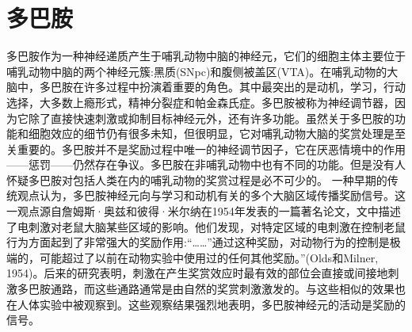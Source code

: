 \section{多巴胺}

多巴胺作为一种神经递质产生于哺乳动物中脑的神经元，它们的细胞主体主要位于哺乳动物中脑的两个神经元簇:黑质(SNpc)和腹侧被盖区(VTA)。在哺乳动物的大脑中，多巴胺在许多过程中扮演着重要的角色。其中最突出的是动机，学习，行动选择，大多数上瘾形式，精神分裂症和帕金森氏症。多巴胺被称为神经调节器，因为它除了直接快速刺激或抑制目标神经元外，还有许多功能。虽然关于多巴胺的功能和细胞效应的细节仍有很多未知，但很明显，它对哺乳动物大脑的奖赏处理是至关重要的。多巴胺并不是奖励过程中唯一的神经调节因子，它在厌恶情境中的作用——惩罚——仍然存在争议。多巴胺在非哺乳动物中也有不同的功能。但是没有人怀疑多巴胺对包括人类在内的哺乳动物的奖赏过程是必不可少的。
一种早期的传统观点认为，多巴胺神经元向与学习和动机有关的多个大脑区域传播奖励信号。这一观点源自詹姆斯·奥兹和彼得·米尔纳在1954年发表的一篇著名论文，文中描述了电刺激对老鼠大脑某些区域的影响。他们发现，对特定区域的电刺激在控制老鼠行为方面起到了非常强大的奖励作用:“……”通过这种奖励，对动物行为的控制是极端的，可能超过了以前在动物实验中使用过的任何其他奖励。”(Olds和Milner, 1954)。后来的研究表明，刺激在产生奖赏效应时最有效的部位会直接或间接地刺激多巴胺通路，而这些通路通常是由自然的奖赏刺激激发的。与这些相似的效果也在人体实验中被观察到。这些观察结果强烈地表明，多巴胺神经元的活动是奖励的信号。


